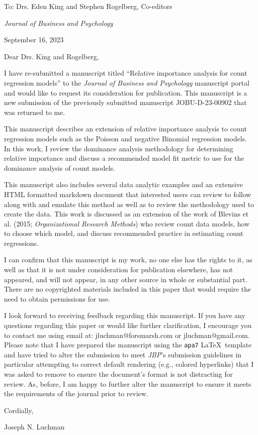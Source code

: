 \documentclass[10pt,letterpaper]{letter}
\begin{document}
	
	To: Drs. Eden King and Stephen Rogelberg, Co-editors
	
	\emph{Journal of Business and Psychology}
	
	September 16, 2023
	
	Dear Drs. King and Rogelberg,
	
	I have re-submitted a manuscript titled “Relative importance analysis for count regression models” to the \emph{Journal of Business and Psychology} manuscript portal and would like to request its consideration for publication. This manuscript is a new submission of the previously submitted manuscript JOBU-D-23-00902 that was returned to me.
	
	This manuscript describes an extension of relative importance analysis to count regression models such as the Poisson and negative Binomial regression models. 
	In this work, I review the dominance analysis methodology for determining relative importance and discuss a recommended model fit metric to use for the dominance analysis of count models.
	
	This manuscript also includes several data analytic examples and an extensive HTML formatted markdown document that interested users can review to follow along with and emulate this method as well as to review the methodology used to create the data. 
	This work is discussed as an extension of the work of Blevins et al. (2015; \emph{Organizational Research Methods}) who review count data models, how to choose which model, and discuss recommended practice in estimating count regressions. 
	
	I can confirm that this manuscript is my work, no one else has the rights to it, as well as that it is not under consideration for publication elsewhere, has not appeared, and will not appear, in any other source in whole or substantial part.  
	There are no copyrighted materials included in this paper that would require the need to obtain permissions for use.
	
	I look forward to receiving feedback regarding this manuscript. 
	If you have any questions regarding this paper or would like further clarification, I encourage you to contact me using email at: jluchman@forsmarsh.com or jluchman@gmail.com. 
	Please note that I have prepared the manuscript using the \texttt{apa7} \LaTeX \ template and have tried to alter the submission to meet \emph{JBP}'s submission guidelines in particular attempting to correct default rendering (e.g., colored hyperlinks) that I was asked to remove to ensure the document's format is not distracting for review.
	As, before, I am happy to further alter the manuscript to ensure it meets the requirements of the journal prior to review.
	
	Cordially,
	
	Joseph N. Luchman
\end{document}
